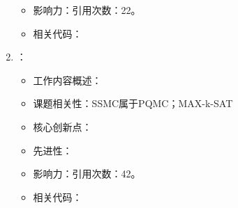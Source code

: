 \begin{enumerate}
\begin{itemize}
                \item 影响力：引用次数：22。
                \item 相关代码：
            \end{itemize}
        \item \citet{jarret2016adiabatic}：
            \begin{itemize}
                \item 工作内容概述：
                \item 课题相关性：SSMC属于PQMC；MAX-k-SAT
                \item 核心创新点：
                \item 先进性：
                \item 影响力：引用次数：42。
                \item 相关代码：
            \end{itemize}
    \end{enumerate}
